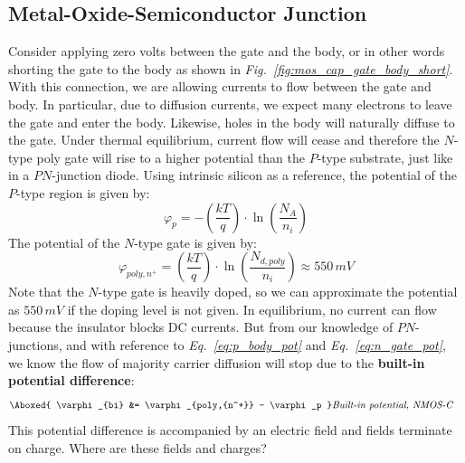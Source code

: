 \subsection{Metal-Oxide-Semiconductor Junction}
Consider applying zero volts between the gate and the body, or in other words shorting the gate to the body as shown in \emph{Fig.~\ref{fig:mos_cap_gate_body_short}}.  With this connection, we are allowing currents to flow between the gate and body.  In particular, due to diffusion currents, we expect many electrons to leave the gate and enter the body. Likewise, holes in the body will naturally diffuse to the gate.  Under thermal equilibrium, current flow will cease and therefore the $N$-type poly gate will rise to a higher potential than the $P$-type substrate, just like in a $PN$-junction diode.  Using intrinsic silicon as a reference, the potential of the $P$-type region is given by:
    \begin{equation}
        \varphi_p = -\left( \frac{kT}{q} \right) \cdot \ln \left( \frac{N_A}{n_i} \right)
        \label{eq:p_body_pot}
    \end{equation}
The potential of the $N$-type gate is given by:
    \begin{equation}
        \varphi_{poly,{n^+}} = \left( \frac{kT}{q} \right) \cdot \ln \left( {\frac{N_{d,poly}}{n_i}} \right) \approx 550\,mV
        \label{eq:n_gate_pot}
    \end{equation}
Note that the $N$-type gate is heavily doped, so we can approximate the potential as $550\,mV$ if the doping level is not given.  In equilibrium, no current can flow because the insulator blocks DC currents.  But from our knowledge of $PN$-junctions, and with reference to \emph{Eq.~\ref{eq:p_body_pot}} and \emph{Eq.~\ref{eq:n_gate_pot}}, we know the flow of majority carrier diffusion will stop due to the \textbf{built-in potential difference}:
    \begin{align}
        \Aboxed{ \varphi_{bi} &= \varphi_{poly,{n^+}} - \varphi_p }  &\textit{Built-in potential, NMOS-C}
        \label{eq:built_in_nmos_c}
    \end{align}
This potential difference is accompanied by an electric field and fields terminate on charge.  Where are these fields and charges?
\newpage
